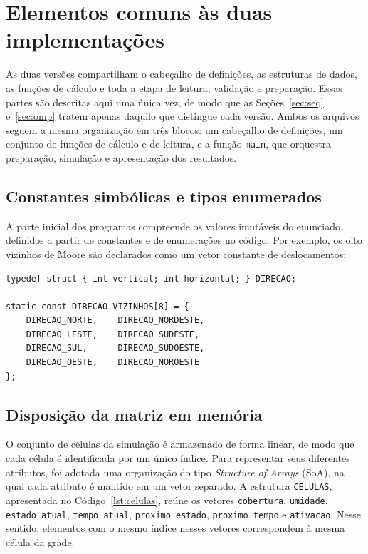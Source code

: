\documentclass[11pt,a4paper]{article}
\begin{document}
\section{Elementos comuns às duas implementações}
\label{sec:comum}

As duas versões compartilham o cabeçalho de definições, as estruturas de dados, as funções de cálculo e toda a etapa de leitura, validação e preparação. Essas partes são descritas aqui uma única vez, de modo que as Seções~\ref{sec:seq} e~\ref{sec:omp} tratem apenas daquilo que distingue cada versão. Ambos os arquivos seguem a mesma organização em três blocos: um cabeçalho de definições, um conjunto de funções de cálculo e de leitura, e a função \texttt{main}, que orquestra preparação, simulação e apresentação dos resultados.

\subsection{Constantes simbólicas e tipos enumerados}

A parte inicial dos programas compreende os valores imutáveis do enunciado, definidos a partir de constantes e de enumerações no código. Por exemplo, os oito vizinhos de Moore são declarados como um vetor constante de deslocamentos:

\begin{lstlisting}[caption={Vizinhança de Moore como vetor de deslocamentos.},label={lst:vizinhos}]
typedef struct { int vertical; int horizontal; } DIRECAO;

static const DIRECAO VIZINHOS[8] = {
    DIRECAO_NORTE,    DIRECAO_NORDESTE,
    DIRECAO_LESTE,    DIRECAO_SUDESTE,
    DIRECAO_SUL,      DIRECAO_SUDOESTE,
    DIRECAO_OESTE,    DIRECAO_NOROESTE
};
\end{lstlisting}

\subsection{Disposição da matriz em memória}
\label{sec:soa}

O conjunto de células da simulação é armazenado de forma linear, de modo que cada célula é identificada por um único índice. Para representar seus diferentes atributos, foi adotada uma organização do tipo \emph{Structure of Arrays} (SoA), na qual cada atributo é mantido em um vetor separado. A estrutura \texttt{CELULAS}, apresentada no Código~\ref{lst:celulas}, reúne os vetores \texttt{cobertura}, \texttt{umidade}, \texttt{estado\_atual}, \texttt{tempo\_atual}, \texttt{proximo\_estado}, \texttt{proximo\_tempo} e \texttt{ativacao}. Nesse sentido, elementos com o mesmo índice nesses vetores correspondem à mesma célula da grade.
\end{document}
